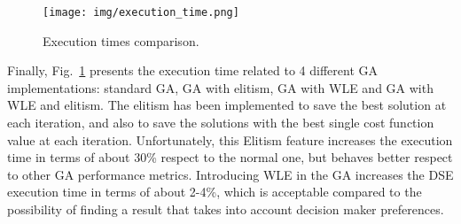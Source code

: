 %
\begin{figure}[htbp]
	\centerline{\texttt{[image: img/execution\_time.png]}}
	\caption{Execution times comparison.}
	\label{execution_time}
\end{figure}
%
Finally, Fig.~\ref{execution_time} presents the execution time related to 4 different GA implementations: standard GA, GA with elitism, GA with WLE and GA with WLE and elitism. The elitism has been implemented to save the best solution at each iteration, and also to save the solutions with the best single cost function value at each iteration. Unfortunately, this Elitism feature increases the execution time in terms of about  30\% respect to the normal one, but behaves better respect to other GA performance metrics. Introducing WLE in the GA increases the DSE execution time in terms of about 2-4\%, which is acceptable compared to the possibility of finding a result that takes into account decision maker preferences. \par
%
